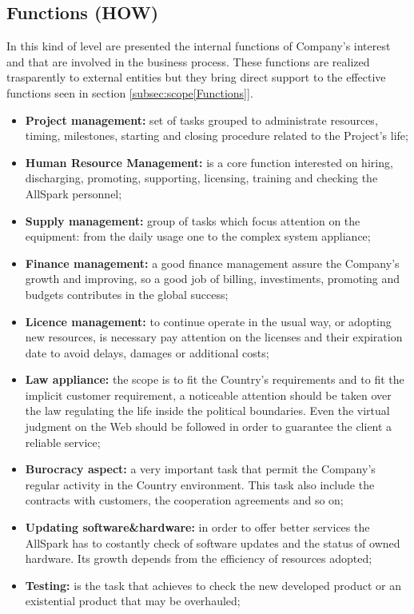 \subsection{Functions (HOW)}
\label{subsec:enterprise[Functions]}
In this kind of level are presented the internal functions of Company's interest and that are involved in the business process. These functions are realized trasparently to external entities but they bring direct support to the effective functions seen in section \ref{subsec:scope[Functions]}.
\begin{itemize}
  \item {\bf Project management:} set of tasks grouped to administrate resources, timing, milestones, starting and closing procedure related to the Project's life;
  \item {\bf Human Resource Management:} is a core function interested on hiring, discharging, promoting, supporting, licensing, training and checking the AllSpark personnel;
  \item {\bf Supply management:} group of tasks which focus attention on the equipment: from the daily usage one to the complex system appliance;
  \item {\bf Finance management:} a good finance management assure the Company's growth and improving, so a good job of billing, investiments, promoting and budgets contributes in the global success;
  \item {\bf Licence management:} to continue operate in the usual way, or adopting new resources, is necessary pay attention on the licenses and their expiration date to avoid delays, damages or additional costs;
  \item {\bf Law appliance:} the scope is to fit the Country's requirements and to fit the implicit customer requirement, a noticeable attention should be taken over the law regulating the life inside the political boundaries. Even the virtual judgment on the Web should be followed in order to guarantee the client a reliable service;
  \item {\bf Burocracy aspect:} a very important task that permit the Company's regular activity in the Country environment. This task also include the contracts with customers, the cooperation agreements and so on;
  \item {\bf Updating software\&hardware:} in order to offer better services the AllSpark has to costantly check of software updates and the status of owned hardware. Its growth depends from the efficiency of resources adopted;
  \item {\bf Testing:} is the task that achieves to check the new developed product or an existential product that may be overhauled;

\end{itemize}
